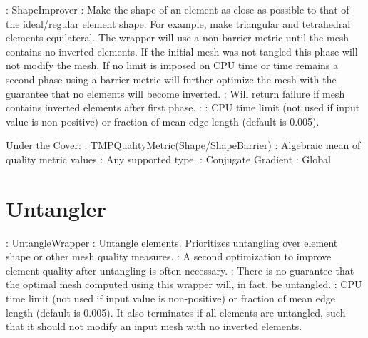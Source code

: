 : ShapeImprover \newline
{}: Make the shape of an element as close as possible to 
that of the ideal/regular element shape. For example, make triangular and 
tetrahedral elements equilateral.  The wrapper will use a non-barrier metric
until the mesh contains no inverted elements.  If the initial mesh was not tangled this phase will not modify the mesh.  If no limit is imposed on CPU
time or time remains a second phase using a barrier metric will further 
optimize the mesh with the guarantee that no elements will become inverted. \newline
{}: Will return failure if mesh contains inverted elements after first phase.\newline
{}:  \newline 
{}: CPU time limit (not used if input 
value is non-positive) or fraction of mean edge length (default is 0.005). \newline \newline

\noindent Under the Cover: \newline
{}: TMPQualityMetric(Shape/ShapeBarrier) \newline
{}: Algebraic mean of quality metric values \newline
{}: Any supported type. \newline
{}: Conjugate Gradient \newline
{}: Global \newline


\section{Untangler} \label{sec:Untangler}

: UntangleWrapper \newline
{}: Untangle elements.  Prioritizes untangling over
element shape or other mesh quality measures.  \newline
{}: A second optimization to improve element quality
after untangling is often necessary.  \newline
{}: There is no guarantee that the optimal mesh computed using this wrapper will, in fact, be untangled.  \newline 
{}: CPU time limit (not used if input 
value is non-positive) or fraction of mean edge length (default is 0.005).  It
also terminates if all elements are untangled, such that it should not modify
an input mesh with no inverted elements. \newline \newline

